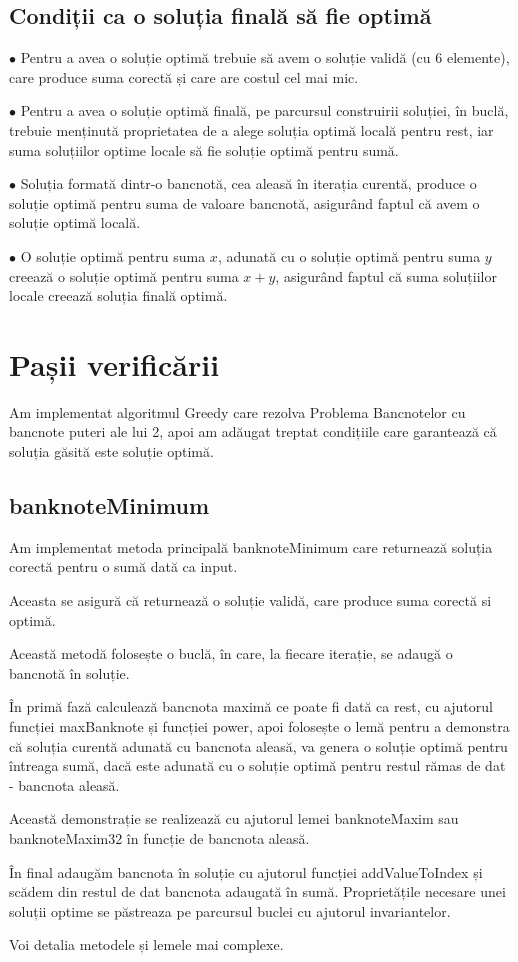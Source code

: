     \subsection{Condiții ca o soluția finală să fie optimă}
    $\bullet$ Pentru a avea o soluție optimă trebuie să avem o soluție validă (cu 6 elemente), care produce suma corectă
     și care are costul cel mai mic.\par
    $\bullet$ Pentru a avea o soluție optimă finală, pe parcursul construirii soluției, în buclă, trebuie menținută proprietatea
     de a alege soluția optimă locală pentru rest, iar suma soluțiilor optime locale să fie soluție optimă pentru sumă.\par
    $\bullet$ Soluția formată dintr-o bancnotă, cea aleasă în iterația curentă, produce o soluție optimă pentru suma 
    de valoare bancnotă, asigurând faptul că avem o soluție optimă locală.\par
    $\bullet$ O soluție optimă pentru suma $x$, adunată cu o soluție optimă pentru suma $y$ creează o soluție optimă pentru suma $x+y$, 
    asigurând faptul că suma soluțiilor locale creează soluția finală optimă.\par
    
\section{Pașii verificării}
Am implementat algoritmul Greedy care rezolva Problema Bancnotelor cu bancnote puteri ale lui 2, 
apoi am adăugat treptat condițiile care garantează că soluția găsită este soluție optimă.
    \subsection{banknoteMinimum}
    Am implementat metoda principală banknoteMinimum care returnează soluția corectă pentru o sumă dată ca input.\par
    Aceasta se asigură că returnează o soluție validă, care produce suma corectă si optimă.\par
    Această metodă folosește o buclă, în care, la fiecare iterație, se adaugă o bancnotă în soluție.\par
    În primă fază calculează bancnota maximă ce poate fi dată ca rest, cu ajutorul funcției 
    maxBanknote și funcției power, apoi folosește o lemă pentru a demonstra că soluția curentă adunată cu bancnota 
    aleasă, va genera o soluție optimă pentru întreaga sumă, dacă este adunată cu o soluție optimă pentru restul 
    rămas de dat - bancnota aleasă.\par
    Această demonstrație se realizează cu ajutorul lemei banknoteMaxim sau banknoteMaxim32 în funcție de bancnota aleasă. \par
    În final adaugăm bancnota în soluție cu ajutorul funcției addValueToIndex și scădem din restul de dat bancnota 
    adaugată în sumă.
    Proprietățile necesare unei soluții optime se păstreaza pe parcursul buclei cu ajutorul invariantelor.\par
    Voi detalia metodele și lemele mai complexe.
     
